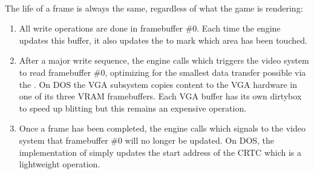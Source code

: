\par
 \\
\par
\vspace{5pt}
\pagebreak
\par
The life of a frame is always the same, regardless of what the game is rendering:
\begin{enumerate}
\item All write operations are done in framebuffer \#0. Each time the engine updates this buffer, it also updates the  to mark which area has been touched.
\item After a major write sequence, the engine calls  which triggers the video system to read framebuffer \#0, optimizing for the smallest data transfer possible via the . On DOS the VGA subsystem copies content to the VGA hardware in one of its three VRAM framebuffers. Each VGA buffer has its own dirtybox  to speed up blitting but this remains an expensive operation.

\item Once a frame has been completed, the engine calls   which signals to the video system that framebuffer \#0 will no longer be updated. On DOS, the implementation of  simply updates the start address of the CRTC which is a lightweight operation.
\end{enumerate}
\par
{}\\

